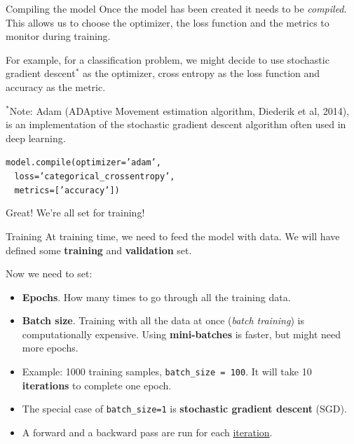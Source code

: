 \documentclass[9pt, aspectratio=169]{beamer}
\begin{document}
\begin{frame}
    {Compiling the model}
    Once the model has been created it needs to be \textit{compiled}. This allows us to choose the optimizer, the loss function and the metrics to monitor during training.

    For example, for a classification problem, we might decide to use stochastic gradient descent$^*$ as the optimizer, cross entropy as the loss function and accuracy as the metric.

    \footnotesize
    $^*$Note: Adam (ADAptive Movement estimation algorithm, Diederik et al, 2014), is an implementation of the stochastic gradient descent algorithm often used in deep learning.

    \vspace{2em}
    \normalsize
    \begin{codebox}
        \texttt{model.compile(optimizer='adam',\\
        $~~~~$loss='categorical\_crossentropy',\\
        $~~~~$metrics=['accuracy'])}
    \end{codebox}

    \normalsize
    Great! We're all set for training!
\end{frame}

\begin{frame}
    {Training}
    At training time, we need to feed the model with data.
    We will have defined some \textbf{training} and \textbf{validation} set.

    Now we need to set:
    \begin{itemize}[<+->]
        \item \textbf{Epochs}. How many times to go through all the training data.
        \item \textbf{Batch size}. Training with all the data at once (\textit{batch training}) is computationally expensive. Using \textbf{mini-batches} is faster, but might need more epochs.
        \item Example: 1000 training samples, \texttt{batch\_size = 100}. It will take 10 \textbf{iterations} to complete one epoch.
        \item The special case of \texttt{batch\_size=1} is \textbf{stochastic gradient descent} (SGD).
        \item A forward and a backward pass are  run for each \underline{iteration}.
    \end{itemize}

\end{frame}
\end{document}
